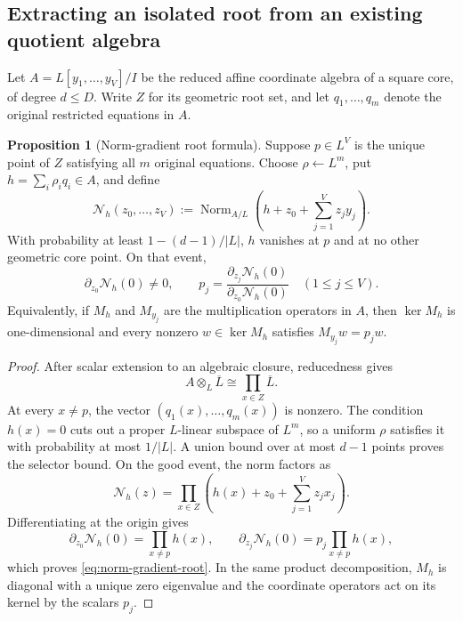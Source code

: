 \documentclass[11pt,a4paper]{article}
\theoremstyle{definition}
\newtheorem{proposition}[theorem]{Proposition}
\theoremstyle{remark}
\begin{document}
\subsection{Extracting an isolated root from an existing quotient algebra}\label{subsec:implicit-extraction}

Let $A=L[y_1,\ldots,y_V]/I$ be the reduced affine coordinate algebra of a square core, of degree $d\le D$.  Write $Z$ for its geometric root set, and let $q_1,\ldots,q_m$ denote the original restricted equations in $A$.

\begin{proposition}[Norm-gradient root formula]\label{prop:implicit-root}
Suppose $p\in L^V$ is the unique point of $Z$ satisfying all $m$ original equations.  Choose $\rho\leftarrow L^m$, put $h=\sum_i\rho_iq_i\in A$, and define
\begin{equation}\label{eq:norm-jet}
\mathcal N_h(z_0,\ldots,z_V)
:=\operatorname{Norm}_{A/L}\!\left(h+z_0+\sum_{j=1}^Vz_jy_j\right).
\end{equation}
With probability at least $1-(d-1)/|L|$, $h$ vanishes at $p$ and at no other geometric core point.  On that event,
\begin{equation}\label{eq:norm-gradient-root}
\partial_{z_0}\mathcal N_h(0)\ne0,
\qquad
p_j=
\frac{\partial_{z_j}\mathcal N_h(0)}
     {\partial_{z_0}\mathcal N_h(0)}
\quad(1\le j\le V).
\end{equation}
Equivalently, if $M_h$ and $M_{y_j}$ are the multiplication operators in $A$, then $\ker M_h$ is one-dimensional and every nonzero $w\in\ker M_h$ satisfies $M_{y_j}w=p_jw$.
\end{proposition}

\begin{proof}
After scalar extension to an algebraic closure, reducedness gives
\[
A\otimes_L\overline L\cong\prod_{x\in Z}\overline L.
\]
At every $x\ne p$, the vector $(q_1(x),\ldots,q_m(x))$ is nonzero.  The condition $h(x)=0$ cuts out a proper $L$-linear subspace of $L^m$, so a uniform $\rho$ satisfies it with probability at most $1/|L|$.  A union bound over at most $d-1$ points proves the selector bound.  On the good event, the norm factors as
\[
\mathcal N_h(z)=
\prod_{x\in Z}\left(h(x)+z_0+\sum_{j=1}^Vz_jx_j\right).
\]
Differentiating at the origin gives
\[
\partial_{z_0}\mathcal N_h(0)=\prod_{x\ne p}h(x),
\qquad
\partial_{z_j}\mathcal N_h(0)=p_j\prod_{x\ne p}h(x),
\]
which proves \eqref{eq:norm-gradient-root}.  In the same product decomposition, $M_h$ is diagonal with a unique zero eigenvalue and the coordinate operators act on its kernel by the scalars $p_j$.
\end{proof}
\end{document}
